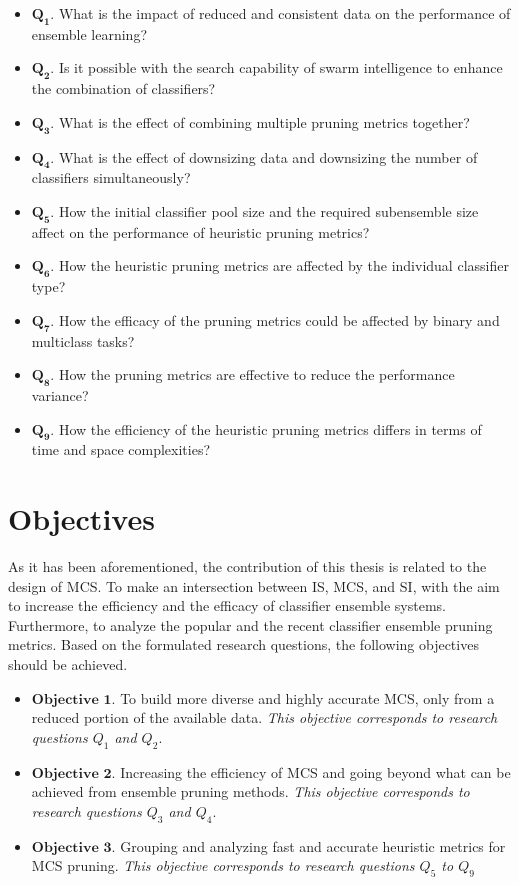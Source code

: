 \begin{itemize}[nosep]
\setlength{\itemindent}{-.5in}
   \item $\pmb{Q_1}$. What is the impact of reduced and consistent data on the performance of ensemble learning?
    \item $\pmb{Q_2}$. Is it possible with the search capability of swarm intelligence to enhance the combination of classifiers? 
    \item $\pmb{Q_3}$. What is the effect of combining multiple pruning metrics together?
    \item $\pmb{Q_4}$. What is the effect of downsizing data and downsizing the number of classifiers simultaneously? 
    \item $\pmb{Q_5}$. How the initial classifier pool size and the required subensemble size affect on the performance of heuristic pruning metrics?
    \item $\pmb{Q_6}$. How the heuristic pruning metrics are affected by the individual classifier type?
    \item $\pmb{Q_7}$. How the efficacy of the pruning metrics could be affected by binary and multiclass tasks?
    \item $\pmb{Q_8}$. How the pruning metrics are effective to reduce the performance variance?
    \item $\pmb{Q_9}$. How the efficiency of the heuristic pruning metrics differs in terms of time and space complexities?
\end{itemize}

	






\section{Objectives}
\label{sec:1_2_opportunity}
As it has been aforementioned, the contribution of this thesis is related to the design of MCS. To make an intersection between IS, MCS, and SI, with the aim to increase the efficiency and the efficacy of classifier ensemble systems. Furthermore, to analyze the popular and the recent classifier ensemble pruning metrics. Based on the formulated research questions, the following objectives should be achieved.  


\begin{itemize}
    \item $\textbf{Objective  1}$. To build more diverse and highly accurate MCS, only from a reduced portion of the available data. \textit{This objective corresponds to research questions $Q_1$ and $Q_2$}.  
    \item $\textbf{Objective  2}$. Increasing the efficiency of MCS and going beyond what can be achieved from ensemble pruning methods. \textit{This objective corresponds to research questions $Q_3$ and $Q_4$}.  
    \item $\textbf{Objective  3}$. Grouping and analyzing fast and accurate heuristic metrics for MCS pruning. \textit{This objective corresponds to research questions $Q_5$ to $Q_9$}  
   
\end{itemize}


